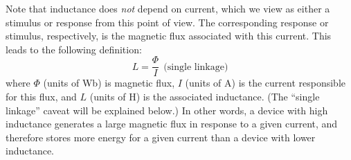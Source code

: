 Note that inductance does \emph{not} depend on current, which we view as either a stimulus or response from this point of view.
The corresponding response or stimulus, respectively, is the magnetic flux 
associated with this current.
This leads to the following definition:
%
\begin{equation}
L = \frac{\Phi}{I} ~~\mbox{(single linkage)}
\label{m0123_Ldef}
\end{equation} 
%
where $\Phi$ (units of Wb) is magnetic flux, $I$ (units of A) is the current responsible for this flux, and $L$ (units of H) is the associated inductance.
(The ``single linkage'' caveat will be explained below.)
In other words, a device with high inductance generates a large magnetic flux in response to a given current, and therefore stores more energy for a given current than a device with lower inductance.

